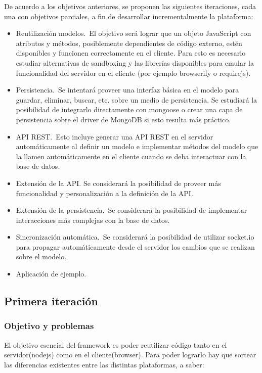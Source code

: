 \documentclass[doc,helv,longtable]{article}
\begin{document}
De acuerdo a los objetivos anteriores, se proponen las siguientes iteraciones, cada una con objetivos parciales, a fin de desarrollar incrementalmente la plataforma:
\begin{itemize}
\item  Reutilización modelos. El objetivo será lograr que un objeto JavaScript con atributos y métodos, posiblemente dependientes de código externo, estén disponibles y funcionen correctamente en el cliente. Para esto es necesario estudiar alternativas de sandboxing\cite{sandbox} y las librerías disponibles para emular la funcionalidad del servidor en el cliente (por ejemplo browserify\cite{browserify} o requirejs\cite{require}).
\item  Persistencia. Se intentará proveer una interfaz básica en el modelo para guardar, eliminar, buscar, etc. sobre un medio de persistencia. Se estudiará la posibilidad de integrarlo directamente con mongoose o crear una capa de persistencia sobre el driver de MongoDB si esto resulta más práctico.
\item  API REST. Esto incluye generar una API REST en el servidor automáticamente al definir un modelo e implementar métodos del modelo que la llamen automáticamente en el cliente cuando se deba interactuar con la base de datos.
\item  Extensión de la API. Se considerará la posibilidad de proveer más funcionalidad y personalización a la definición de la API.
\item  Extensión de la persistencia. Se considerará la posibilidad de implementar interacciones más complejas con la base de datos.
\item  Sincronización automática. Se considerará la posibilidad de utilizar socket.io para propagar automáticamente desde el servidor los cambios que se realizan sobre el modelo.
\item  Aplicación de ejemplo.

\end{itemize}
\subsection{Primera iteración}
\subsubsection{Objetivo y problemas}


El objetivo esencial del framework es poder reutilizar código tanto en el servidor(nodejs) como en el cliente(browser). Para poder lograrlo hay que sortear las diferencias existentes entre las distintas plataformas, a saber:
\end{document}
